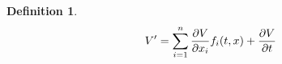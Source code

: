 \documentclass{article}
\newtheorem{dfn}{Definition}[section]
\begin{document}
\begin{dfn}
	$$V' = \sum^n_{i=1} {\partial V \over \partial x_i} f_i(t,x) +
{\partial V \over \partial t}$$
\end{dfn}
\end{document}
